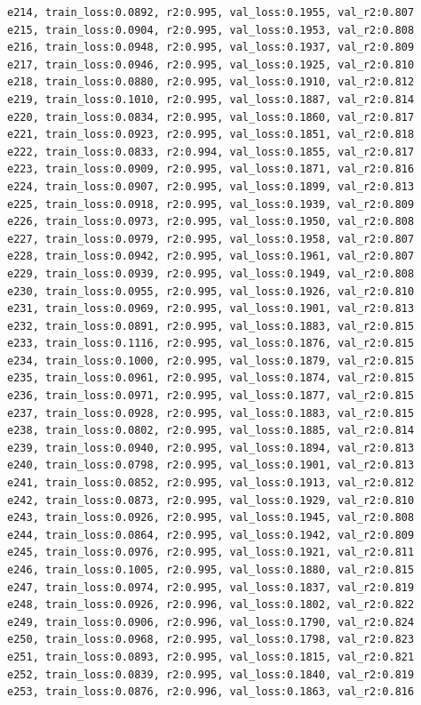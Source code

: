 \documentclass[a4paper, 12pt]{article}
\begin{document}
\begin{lstlisting}
e214, train_loss:0.0892, r2:0.995, val_loss:0.1955, val_r2:0.807
e215, train_loss:0.0904, r2:0.995, val_loss:0.1953, val_r2:0.808
e216, train_loss:0.0948, r2:0.995, val_loss:0.1937, val_r2:0.809
e217, train_loss:0.0946, r2:0.995, val_loss:0.1925, val_r2:0.810
e218, train_loss:0.0880, r2:0.995, val_loss:0.1910, val_r2:0.812
e219, train_loss:0.1010, r2:0.995, val_loss:0.1887, val_r2:0.814
e220, train_loss:0.0834, r2:0.995, val_loss:0.1860, val_r2:0.817
e221, train_loss:0.0923, r2:0.995, val_loss:0.1851, val_r2:0.818
e222, train_loss:0.0833, r2:0.994, val_loss:0.1855, val_r2:0.817
e223, train_loss:0.0909, r2:0.995, val_loss:0.1871, val_r2:0.816
e224, train_loss:0.0907, r2:0.995, val_loss:0.1899, val_r2:0.813
e225, train_loss:0.0918, r2:0.995, val_loss:0.1939, val_r2:0.809
e226, train_loss:0.0973, r2:0.995, val_loss:0.1950, val_r2:0.808
e227, train_loss:0.0979, r2:0.995, val_loss:0.1958, val_r2:0.807
e228, train_loss:0.0942, r2:0.995, val_loss:0.1961, val_r2:0.807
e229, train_loss:0.0939, r2:0.995, val_loss:0.1949, val_r2:0.808
e230, train_loss:0.0955, r2:0.995, val_loss:0.1926, val_r2:0.810
e231, train_loss:0.0969, r2:0.995, val_loss:0.1901, val_r2:0.813
e232, train_loss:0.0891, r2:0.995, val_loss:0.1883, val_r2:0.815
e233, train_loss:0.1116, r2:0.995, val_loss:0.1876, val_r2:0.815
e234, train_loss:0.1000, r2:0.995, val_loss:0.1879, val_r2:0.815
e235, train_loss:0.0961, r2:0.995, val_loss:0.1874, val_r2:0.815
e236, train_loss:0.0971, r2:0.995, val_loss:0.1877, val_r2:0.815
e237, train_loss:0.0928, r2:0.995, val_loss:0.1883, val_r2:0.815
e238, train_loss:0.0802, r2:0.995, val_loss:0.1885, val_r2:0.814
e239, train_loss:0.0940, r2:0.995, val_loss:0.1894, val_r2:0.813
e240, train_loss:0.0798, r2:0.995, val_loss:0.1901, val_r2:0.813
e241, train_loss:0.0852, r2:0.995, val_loss:0.1913, val_r2:0.812
e242, train_loss:0.0873, r2:0.995, val_loss:0.1929, val_r2:0.810
e243, train_loss:0.0926, r2:0.995, val_loss:0.1945, val_r2:0.808
e244, train_loss:0.0864, r2:0.995, val_loss:0.1942, val_r2:0.809
e245, train_loss:0.0976, r2:0.995, val_loss:0.1921, val_r2:0.811
e246, train_loss:0.1005, r2:0.995, val_loss:0.1880, val_r2:0.815
e247, train_loss:0.0974, r2:0.995, val_loss:0.1837, val_r2:0.819
e248, train_loss:0.0926, r2:0.996, val_loss:0.1802, val_r2:0.822
e249, train_loss:0.0906, r2:0.996, val_loss:0.1790, val_r2:0.824
e250, train_loss:0.0968, r2:0.995, val_loss:0.1798, val_r2:0.823
e251, train_loss:0.0893, r2:0.995, val_loss:0.1815, val_r2:0.821
e252, train_loss:0.0839, r2:0.995, val_loss:0.1840, val_r2:0.819
e253, train_loss:0.0876, r2:0.996, val_loss:0.1863, val_r2:0.816

\end{lstlisting}
\end{document}
